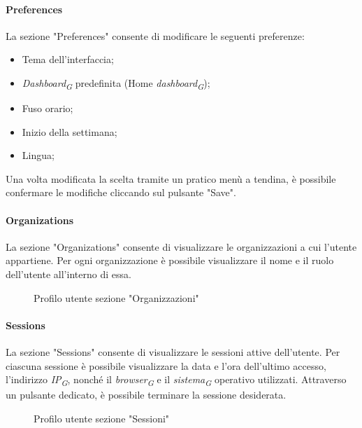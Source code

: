 \paragraph{Preferences}
La sezione "Preferences" consente di modificare le seguenti preferenze:
\begin{itemize}
    \item Tema dell'interfaccia;
    \item \textit{Dashboard}\textsubscript{\textit{G}} predefinita (Home \textit{dashboard}\textsubscript{\textit{G}});
    \item Fuso orario;
    \item Inizio della settimana;
    \item Lingua;
\end{itemize}
Una volta modificata la scelta tramite un pratico menù a tendina, è possibile confermare le modifiche cliccando sul pulsante "Save". \\
\paragraph{Organizations}
La sezione "Organizations" consente di visualizzare le organizzazioni a cui l'utente appartiene. Per ogni organizzazione è possibile visualizzare il nome e il ruolo dell'utente all'interno di essa.
\begin{figure}[H]
    \centering
    \caption{Profilo utente sezione "Organizzazioni"}
    \label{fig:my_label}
\end{figure}
\paragraph{Sessions}
La sezione "Sessions" consente di visualizzare le sessioni attive dell'utente. Per ciascuna sessione è possibile visualizzare la data e l'ora dell'ultimo accesso, l'indirizzo \textit{IP}\textsubscript{\textit{G}}, nonché il \textit{browser}\textsubscript{\textit{G}} e il \textit{sistema}\textsubscript{\textit{G}} operativo utilizzati. Attraverso un pulsante dedicato, è possibile terminare la sessione desiderata.
\begin{figure}[H]
    \centering
    \caption{Profilo utente sezione "Sessioni"}
    \label{fig:my_label}
\end{figure}

